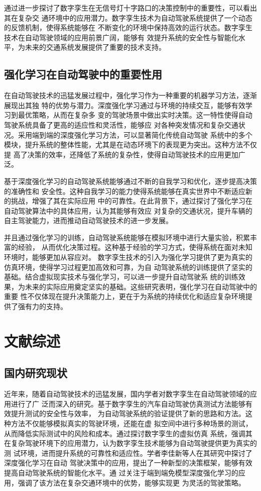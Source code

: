 通过进一步探讨了数字孪生在无信号灯十字路口的决策控制中的重要性，可以看出其在复杂交
通环境中的应用潜力。数字孪生技术为自动驾驶系统提供了一个动态的反馈机制，使得系统能够在
不断变化的环境中保持高效的运行状态。数字孪生技术在自动驾驶领域的应用前景广阔，能够有
效提升系统的安全性与智能化水平，为未来的交通系统发展提供了重要的技术支持。

\subsection{强化学习在自动驾驶中的重要性用}

在自动驾驶技术的迅猛发展过程中，强化学习作为一种重要的机器学习方法，逐渐展现出其独
特的优势与潜力。深度强化学习通过与环境的持续交互，能够有效学习到最优策略，从而在复杂多
变的驾驶场景中做出实时决策。这一特性使得自动驾驶系统具备了更高的适应性和灵活性，能够应
对各种突发情况和复杂交通状况。采用端到端的深度强化学习方法，可以显著简化传统自动驾驶
系统中的多个模块，提升系统的整体性能，尤其是在动态环境下的表现更为突出。这种方法不仅提
高了决策的效率，还降低了系统的复杂性，使得自动驾驶技术的应用更加广泛。

基于深度强化学习的自动驾驶系统能够通过不断的自我学习和优化，逐步提高决策的准确性和
安全性。这种自我学习的能力使得系统能够在真实世界中不断适应新的挑战，增强了其在实际应用
中的可靠性。在此背景下，通过探讨了强化学习在自动驾驶算法中的具体应用，认为其能够有效应
对复杂的交通状况，提升车辆的自主驾驶能力，进而推动自动驾驶技术的进一步发展。

并且通过强化学习的训练，自动驾驶系统能够在模拟环境中进行大量实验，积累丰富的经验，
从而优化决策过程。这种基于经验的学习方式，使得系统在面对未知环境时，能够更加从容应对。
数字孪生技术的引入为强化学习提供了更为真实的仿真环境，使得学习过程更加高效和可靠，为自
动驾驶系统的训练提供了坚实的基础。结合虚拟现实技术与强化学习，可以进一步提升自动驾驶系
统的训练效果，为未来的实际应用奠定坚实的基础。这些研究表明，强化学习在自动驾驶中的重要
性不仅体现在提升决策能力上，更在于为系统的持续优化和适应复杂环境提供了强有力的支持。

\section{文献综述}

\subsection{国内研究现状}

近年来，随着自动驾驶技术的迅猛发展，国内学者对数字孪生在自动驾驶领域的应用进行了广
泛而深入的研究。基于数字孪生的汽车自动驾驶仿真测试方法能够有效提升测试的安全性与效率，
为自动驾驶系统的验证提供了新的思路和方法。这种方法不仅能够模拟真实的驾驶环境，还能在虚
拟空间中进行多种场景的测试，从而降低实际测试中的风险和成本。通过探讨数字孪生的虚拟仿真
系统，强调其在复杂驾驶环境下的应用潜力，认为数字孪生技术能够为自动驾驶提供更为真实的测
试环境，进而提升系统的可靠性和适应性。学者李佳新等人在其研究中探讨了深度强化学习在自动
驾驶决策中的应用，提出了一种新型的决策框架，能够有效提高自动驾驶系统的智能化水平。通
过关注于端到端免模型深度强化学习的应用，强调了该方法在复杂交通环境中的优势，能够实现更
为灵活的驾驶策略。

